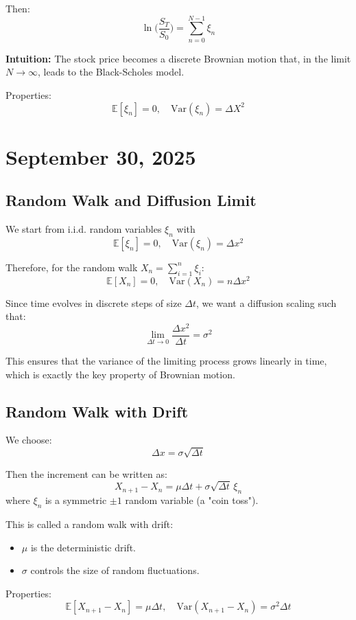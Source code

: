 \documentclass[12pt,a4paper]{article}
\theoremstyle{definition}
\begin{document}
Then:
\[
\ln\!\Big(\frac{S_T}{S_0}\Big) = \sum_{n=0}^{N-1}\xi_n
\]

\textbf{Intuition:} The stock price becomes a discrete Brownian motion that, in the limit $N\to\infty$, leads to the Black-Scholes model.

Properties:
\[
\mathbb{E}[\xi_n] = 0, \quad \text{Var}(\xi_n) = \Delta X^2
\]


\newpage
\section{September 30, 2025}

\subsection{Random Walk and Diffusion Limit}

We start from i.i.d. random variables $\xi_n$ with
\[
\mathbb{E}[\xi_n] = 0, \quad \text{Var}(\xi_n) = \Delta x^2
\]

Therefore, for the random walk $X_n = \sum_{i=1}^n \xi_i$:
\[
\mathbb{E}[X_n] = 0, \quad \text{Var}(X_n) = n \Delta x^2
\]

Since time evolves in discrete steps of size $\Delta t$, we want a diffusion scaling such that:
\[
\lim_{\Delta t \to 0} \frac{\Delta x^2}{\Delta t} = \sigma^2
\]

This ensures that the variance of the limiting process grows linearly in time, which is exactly the key property of Brownian motion.

\subsection{Random Walk with Drift}

We choose:
\[
\Delta x = \sigma \sqrt{\Delta t}
\]

Then the increment can be written as:
\[
X_{n+1} - X_n = \mu \Delta t + \sigma \sqrt{\Delta t}\,\xi_n
\]
where $\xi_n$ is a symmetric $\pm 1$ random variable (a "coin toss").

This is called a random walk with drift:
\begin{itemize}
\item $\mu$ is the deterministic drift.
\item $\sigma$ controls the size of random fluctuations.
\end{itemize}

Properties:
\[
\mathbb{E}[X_{n+1} - X_n] = \mu \Delta t, \quad
\text{Var}(X_{n+1} - X_n) = \sigma^2 \Delta t
\]
\end{document}
